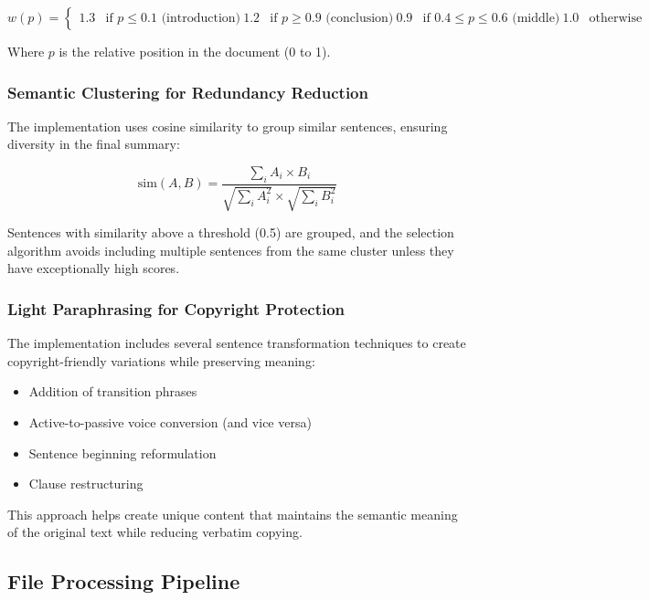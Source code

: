 \documentclass[12pt,a4paper]{article}
\begin{document}
\begin{equation}
w(p) = 
\begin{cases} 
1.3 & \text{if } p \leq 0.1 \text{ (introduction)} \
1.2 & \text{if } p \geq 0.9 \text{ (conclusion)} \
0.9 & \text{if } 0.4 \leq p \leq 0.6 \text{ (middle)} \
1.0 & \text{otherwise}
\end{cases}
\end{equation}

Where $p$ is the relative position in the document (0 to 1).

\subsubsection{Semantic Clustering for Redundancy Reduction}

The implementation uses cosine similarity to group similar sentences, ensuring diversity in the final summary:

\begin{equation}
\text{sim}(A,B) = \frac{\sum_{i} A_i \times B_i}{\sqrt{\sum_{i} A_i^2} \times \sqrt{\sum_{i} B_i^2}}
\end{equation}

Sentences with similarity above a threshold (0.5) are grouped, and the selection algorithm avoids including multiple sentences from the same cluster unless they have exceptionally high scores.

\subsubsection{Light Paraphrasing for Copyright Protection}

The implementation includes several sentence transformation techniques to create copyright-friendly variations while preserving meaning:

\begin{itemize}
    \item Addition of transition phrases
    \item Active-to-passive voice conversion (and vice versa)
    \item Sentence beginning reformulation
    \item Clause restructuring
\end{itemize}

This approach helps create unique content that maintains the semantic meaning of the original text while reducing verbatim copying.

\subsection{File Processing Pipeline}
\end{document}
